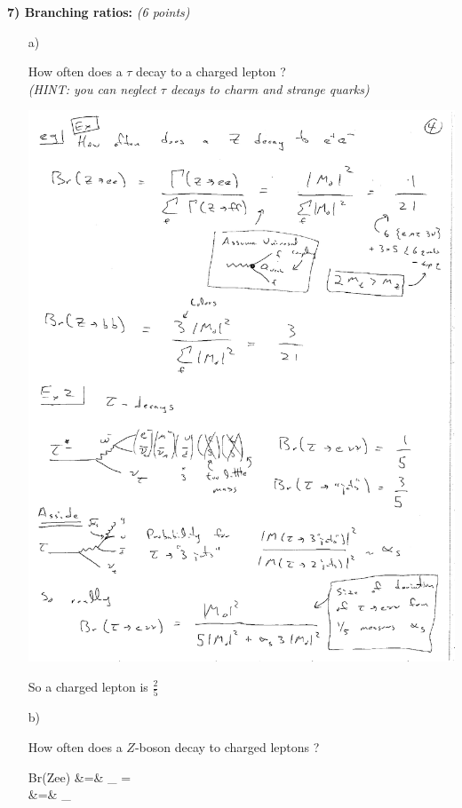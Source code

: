 {\textbf{7) Branching ratios:  } \hfill \textit{(6 points)}\\
\begin{itemize}
\item[a)]{How often does a $\tau$ decay to a charged lepton ? \\ \textit{(HINT: you can neglect $\tau$ decays to charm and strange quarks) }  

\includegraphics[width=1.0\textwidth]{./tauDecays.pdf}

So a charged lepton is $\frac{2}{5}$

}
\item[b)]{How often does a $Z$-boson decay to charged leptons ?

\bea
Br(Z\rightarrow ee)  &=&    \underbrace{=}_{}   = \\
&=& _{}
\eea

}
\end{itemize}}
